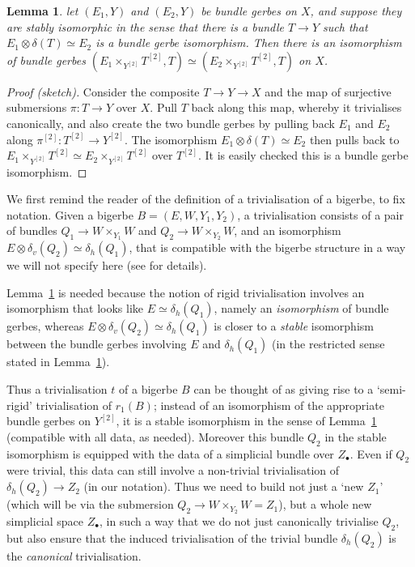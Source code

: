 \documentclass[12pt]{amsart}
\theoremstyle{plain}
\newtheorem{lemma}[theorem]{Lemma}
\theoremstyle{definition}
\theoremstyle{remark}
\numberwithin{equation}{section}
\newcommand{\<}{\langle}
\renewcommand{\>}{\rangle}
\begin{document}
\begin{lemma}\label{lemma:upgradeStableTriv}
let $(E_1,Y)$ and $(E_2,Y)$ be bundle gerbes on $X$, and suppose they are stably isomorphic in the sense that there is a bundle $T\to Y$ such that $E_1\otimes \delta(T) \simeq E_2$ is a bundle gerbe isomorphism. 
Then there is an isomorphism of bundle gerbes $(E_1\times_{Y^{[2]}}T^{[2]},T) \simeq (E_2\times_{Y^{[2]}}T^{[2]},T)$ on $X$.
\end{lemma}
\begin{proof}[Proof (sketch)]
    Consider the composite $T\to Y \to X$ and the map of surjective submersions $\pi\colon T \to Y$ over $X$.
    Pull $T$ back along this map, whereby it trivialises canonically, and also create the two bundle gerbes by pulling back $E_1$ and $E_2$ along $\pi^{[2]}\colon T^{[2]} \to Y^{[2]}$.
    The isomorphism $E_1\otimes \delta(T) \simeq E_2$ then pulls back to $E_1\times_{Y^{[2]}}T^{[2]} \simeq E_2\times_{Y^{[2]}}T^{[2]}$ over $T^{[2]}$.
    It is easily checked this is a bundle gerbe isomorphism.
\end{proof}

We first remind the reader of the definition of a trivialisation of a bigerbe, to fix notation.
Given a bigerbe $B = (E,W,Y_1,Y_2)$, a trivialisation consists of a pair of bundles $Q_1\to W\times_{Y_1}W$ and $Q_2\to W\times_{Y_2}W$, and an isomorphism $E \otimes \delta_v(Q_2)\simeq \delta_h(Q_1)$, that is compatible with the bigerbe structure in a way we will not specify here (see \cite[Definition~4.6]{KM19} for details).

Lemma~\ref{lemma:upgradeStableTriv} is needed because the notion of rigid trivialisation involves an isomorphism that looks like $E\simeq \delta_h(Q_1)$, namely an \emph{isomorphism} of bundle gerbes, whereas $E \otimes \delta_v(Q_2)\simeq \delta_h(Q_1)$ is closer to a \emph{stable} isomorphism between the bundle gerbes involving $E$ and $\delta_h(Q_1)$ (in the restricted sense stated in Lemma~\ref{lemma:upgradeStableTriv}).

Thus a trivialisation $t$ of a bigerbe $B$ can be thought of as giving rise to a `semi-rigid' trivialisation of $r_1(B)$; instead of an isomorphism of the appropriate bundle gerbes on $Y^{[2]}$, it is a stable isomorphism in the sense of Lemma~\ref{lemma:upgradeStableTriv} (compatible with all data, as needed).
Moreover this bundle $Q_2$ in the stable isomorphism is equipped with the data of a simplicial bundle over $Z_\bullet$.
Even if $Q_2$ were trivial, this data can still involve a non-trivial trivialisation of $\delta_h(Q_2)\to Z_2$ (in our notation).
Thus we need to build not just a `new $Z_1$' (which will be via the submersion $Q_2 \to W\times_{Y_2}W = Z_1$), but a whole new simplicial space $Z_\bullet$, in such a way that we do not just canonically trivialise $Q_2$, but also ensure that the induced trivialisation of the trivial bundle $\delta_h(Q_2)$ is the \emph{canonical} trivialisation.
\end{document}

